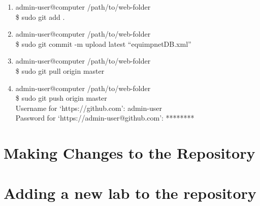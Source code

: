 \documentclass[justified]{article}
\begin{document}
\begin{enumerate}
\item admin-user@computer /path/to/web-folder\\
	\$ sudo git add .
\item admin-user@computer /path/to/web-folder\\
	\$ sudo git commit -m upload latest ``equimpnetDB.xml''
\item admin-user@computer /path/to/web-folder\\
	\$ sudo git pull origin master
\item admin-user@computer /path/to/web-folder\\
	\$ sudo git push origin master\\
	Username for `https://github.com': admin-user\\
	Password for `https://admin-user@github.com': ********
\end{enumerate}


\section{Making Changes to the Repository}



\section{Adding a new lab to the repository}



\end{document}
